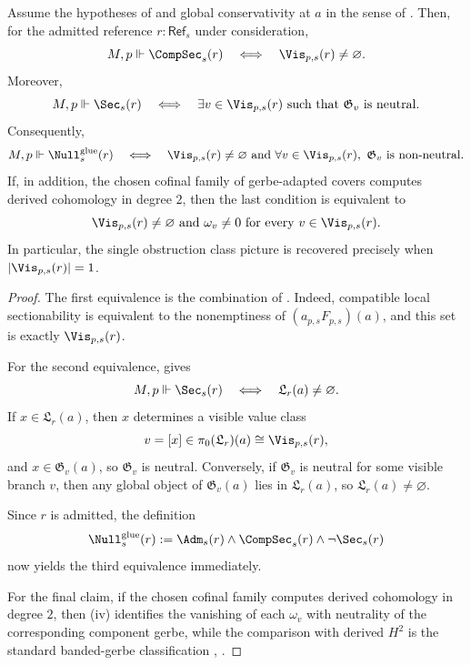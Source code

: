 \begin{theorem}\label{thm:gerbe-null-semantics}
Assume the hypotheses of  and global conservativity at $a$ in the sense of . Then, for the admitted reference $r:\mathsf{Ref}_s$ under consideration,
\[
M,p\Vdash \CompSec_s(r)
\quad\Longleftrightarrow\quad
\Vis_{p,s}(r)\neq\varnothing.
\]
Moreover,
\[
M,p\Vdash \Sec_s(r)
\quad\Longleftrightarrow\quad
\exists v\in \Vis_{p,s}(r)\ \text{such that}\ \mathfrak G_v\ \text{is neutral}.
\]
Consequently,
\[
M,p\Vdash \Null^{\mathrm{glue}}_s(r)
\quad\Longleftrightarrow\quad
\Vis_{p,s}(r)\neq\varnothing
\ \text{and}\
\forall v\in \Vis_{p,s}(r),\ \mathfrak G_v\ \text{is non-neutral}.
\]
If, in addition, the chosen cofinal family of gerbe-adapted covers computes derived cohomology in degree $2$, then the last condition is equivalent to
\[
\Vis_{p,s}(r)\neq\varnothing
\ \text{and}\
\omega_v\neq 0\ \text{for every}\ v\in \Vis_{p,s}(r).
\]
In particular, the single obstruction class picture is recovered precisely when $|\Vis_{p,s}(r)|=1$.
\end{theorem}

\begin{proof}
The first equivalence is the combination of . Indeed, compatible local sectionability is equivalent to the nonemptiness of $(a_{p,s}F_{p,s})(a)$, and this set is exactly $\Vis_{p,s}(r)$.

For the second equivalence, \Cref{prop:no-new-global-objects} gives
\[
M,p\Vdash \Sec_s(r)
\quad\Longleftrightarrow\quad
\mathfrak L_r(a)\neq\varnothing.
\]
If $x\in \mathfrak L_r(a)$, then $x$ determines a visible value class
\[
v=[x]\in \pi_0(\mathfrak L_r)(a)\cong \Vis_{p,s}(r),
\]
and $x\in \mathfrak G_v(a)$, so $\mathfrak G_v$ is neutral. Conversely, if $\mathfrak G_v$ is neutral for some visible branch $v$, then any global object of $\mathfrak G_v(a)$ lies in $\mathfrak L_r(a)$, so $\mathfrak L_r(a)\neq\varnothing$.

Since $r$ is admitted, the definition
\[
\Null^{\mathrm{glue}}_s(r):=\Adm_s(r)\land \CompSec_s(r)\land \neg\Sec_s(r)
\]
now yields the third equivalence immediately.

For the final claim, if the chosen cofinal family computes derived cohomology in degree $2$, then (iv) identifies the vanishing of each $\omega_v$ with neutrality of the corresponding component gerbe, while the comparison with derived $H^2$ is the standard banded-gerbe classification \cite[Chap.~IV]{Giraud1971}, \cite[Tag 06NY]{StacksProject}.
\end{proof}
